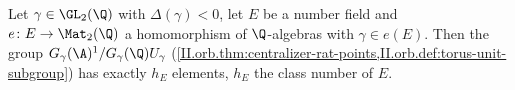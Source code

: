 Let $\gamma\in\GL_2(\Q)$ with $\Delta(\gamma)<0$, let $E$ be a number field and $e\colon E\to\Mat_2(\Q)$ a homomorphism of $\Q$-algebras with $\gamma\in e(E)$. Then the
group $G_\gamma(\A)^1/G_\gamma(\Q)U_\gamma$ (\cref{II.orb.thm:centralizer-rat-points,II.orb.def:torus-unit-subgroup}) has exactly $h_E$ elements, $h_E$ the class number of $E$.
